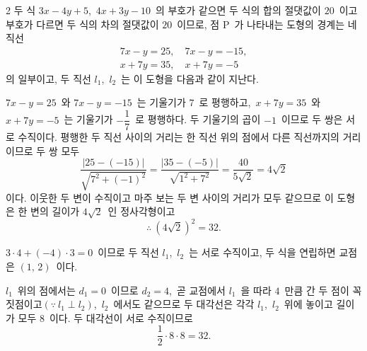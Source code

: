 \documentclass[10pt,fleqn]{article}
\begin{document}
\begin{multicols*}{2}
두 식 $3x-4y+5$,\ $4x+3y-10$\ 의 부호가 같으면 두 식의 합의 절댓값이 $20$\ 이고 부호가 다르면 두 식의 차의 절댓값이 $20$\ 이므로, 점 $\mathrm{P}$\ 가 나타내는 도형의 경계는 네 직선
\begin{gather*}
7x-y=25,\quad 7x-y=-15,\\
x+7y=35,\quad x+7y=-5
\end{gather*}
의 일부이고, 두 직선 $l_{1}$,\ $l_{2}$\ 는 이 도형을 다음과 같이 지난다.

\begin{center}
\end{center}

$7x-y=25$\ 와 $7x-y=-15$\ 는 기울기가 $7$\ 로 평행하고,\ $x+7y=35$\ 와 $x+7y=-5$\ 는 기울기가 $-\dfrac{1}{7}$\ 로 평행하다. 두 기울기의 곱이 $-1$\ 이므로 두 쌍은 서로 수직이다. 평행한 두 직선 사이의 거리는 한 직선 위의 점에서 다른 직선까지의 거리이므로 두 쌍 모두
$$\dfrac{|25-(-15)|}{\sqrt{7^{2}+(-1)^{2}}}=\dfrac{|35-(-5)|}{\sqrt{1^{2}+7^{2}}}=\dfrac{40}{5\sqrt{2}}=4\sqrt{2}$$
이다. 이웃한 두 변이 수직이고 마주 보는 두 변 사이의 거리가 모두 같으므로 이 도형은 한 변의 길이가 $4\sqrt{2}$\ 인 정사각형이고
$$\therefore\ (4\sqrt{2})^{2}=32.$$

\dmothersolution
$3\cdot 4+(-4)\cdot 3=0$\ 이므로 두 직선 $l_{1}$,\ $l_{2}$\ 는 서로 수직이고, 두 식을 연립하면 교점은 $(1,\,2)$\ 이다.

$l_{1}$\ 위의 점에서는 $d_{1}=0$\ 이므로 $d_{2}=4$,\ 곧 교점에서 $l_{1}$\ 을 따라 $4$\ 만큼 간 두 점이 꼭짓점이고\quad$(\because\ l_{1}\perp l_{2})$,\ $l_{2}$\ 에서도 같으므로 두 대각선은 각각 $l_{1}$,\ $l_{2}$\ 위에 놓이고 길이가 모두 $8$\ 이다. 두 대각선이 서로 수직이므로
$$\dfrac{1}{2}\cdot 8\cdot 8=32.$$


\end{multicols*}
\end{document}
